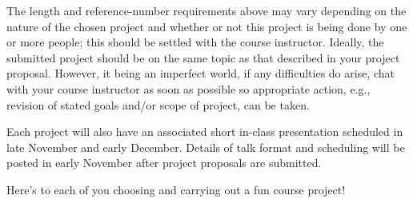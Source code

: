 \documentclass{article}
\begin{document}
	The length and reference-number requirements above may vary depending on the nature of the chosen project and whether or not this project is being done by one or more people; this should be settled with the course instructor. Ideally, the submitted project should be on the same topic as that described in your project proposal. However, it being an imperfect world, if any difficulties do arise, chat with your course instructor as soon as possible so appropriate action, e.g., revision of stated goals and/or scope of project, can be taken.
	
	Each project will also have an associated short in-class presentation scheduled in late November and early December. Details of talk format and scheduling will be posted in early November after project proposals are submitted.
	
	Here's to each of you choosing and carrying out a fun course project!
\end{document}
